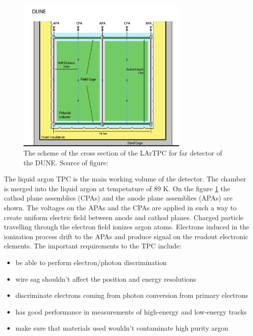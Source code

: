 \begin{figure}
\caption{The scheme of the cross section of the LArTPC for far detector of the DUNE. Source of figure: \cite{ref_LBNFdoc_volume-detectors}}
\label{fig:farDetector_TPC}
\centering
\includegraphics[width=0.75\textwidth, keepaspectratio=true]{figs/farDetector_TPC.png}
\end{figure}

The liquid argon TPC is the main working volume of the detector. The chamber is merged into the liquid argon at tempetature of 89 K. On the figure \ref{fig:farDetector_TPC} the cathod plane assemblies (CPAs) and the anode plane assemblies (APAs) are shown. The voltages on the APAs and the CPAs are applied in such a way to create uniform electric field between anode and cathod planes. Charged particle travelling through the electron field ionizes argon atoms. Electrons induced in the ionization process drift to the APAs and produce signal on the readout electronic elements.
The important requirements to the TPC include:

\begin{itemize}
  \item be able to perform electron/photon discrimination
  \item wire sag shouldn't affect the position and energy resolutions
  \item discriminate electrons coming from photon conversion from primary electrons
  \item has good performance in measurements of high-energy and low-energy tracks
  \item make sure that materials used wouldn't contaminate high purity argon
\end{itemize}

